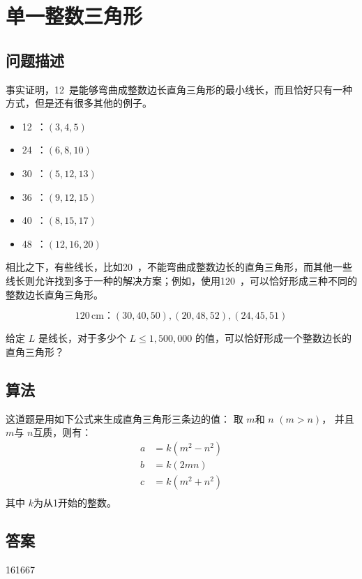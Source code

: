 \section{单一整数三角形}\label{sec:problem75}
\subsection{问题描述}
\begin{tcolorbox}
	事实证明，12\,  是能够弯曲成整数边长直角三角形的最小线长，而且恰好只有一种方式，但是还有很多其他的例子。

	\begin{itemize}[itemsep=0pt]
		\item  12\, ：\((3, 4, 5)\)
		\item  24\, ：\((6, 8, 10)\)
		\item  30\, ：\((5, 12, 13)\)
		\item  36\, ：\((9, 12, 15)\)
		\item  40\, ：\((8, 15, 17)\)
		\item  48\, ：\((12, 16, 20)\)
	\end{itemize}

	相比之下，有些线长，比如20\, ，不能弯曲成整数边长的直角三角形，而其他一些线长则允许找到多于一种的解决方案；例如，使用120\, ，可以恰好形成三种不同的整数边长直角三角形。

	\begin{equation*}
		120\, \text{cm}：(30, 40, 50), (20, 48, 52), (24, 45, 51)
	\end{equation*}

	给定 \( L \) 是线长，对于多少个 \( L \leq 1,500,000 \) 的值，可以恰好形成一个整数边长的直角三角形？

\end{tcolorbox}

\subsection{算法}
这道题是用如下公式来生成直角三角形三条边的值：
取 \( m \)和 \( n \) \( (m > n) \)， 并且 \( m \)与 \( n \)互质，则有：
\begin{align*}
	a & = k(m^2 - n^2) \\
	b & = k(2mn)       \\
	c & = k(m^2 + n^2) \\
\end{align*}
其中 \( k \)为从1开始的整数。

\subsection{答案}
161667
